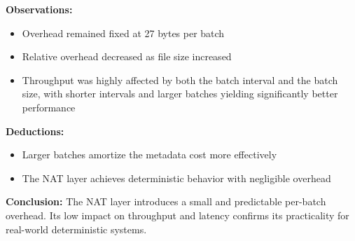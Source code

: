 \documentclass[10pt]{IEEEtran}
\begin{document}
\textbf{Observations:}
\begin{itemize}
\item Overhead remained fixed at 27 bytes per batch
\item Relative overhead decreased as file size increased
\item Throughput was highly affected by both the batch interval and the batch size, with shorter intervals and larger batches yielding significantly better performance
\end{itemize}
\textbf{Deductions:}
\begin{itemize}
    \item Larger batches amortize the metadata cost more effectively
    \item The NAT layer achieves deterministic behavior with negligible overhead
\end{itemize}

\textbf{Conclusion:} The NAT layer introduces a small and predictable per-batch overhead. Its low impact on throughput and latency confirms its practicality for real-world deterministic systems.
\end{document}

